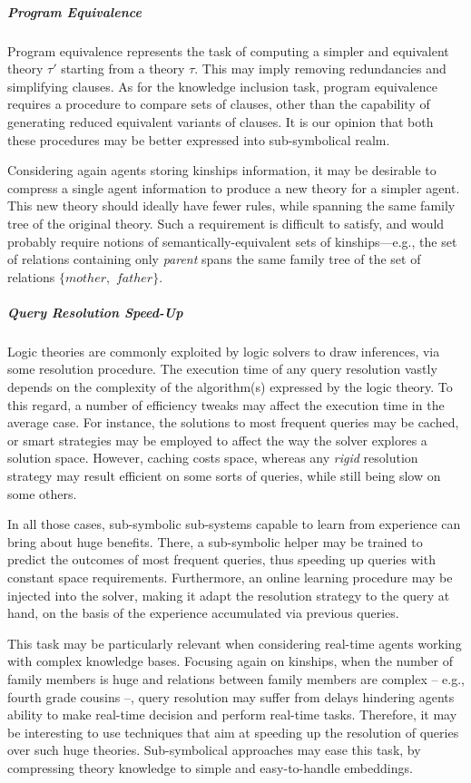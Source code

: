 \documentclass[12pt,a4paper,openright,twoside]{book}
\begin{document}
\subparagraph{Program Equivalence}

Program equivalence represents the task of computing a simpler and equivalent theory $\tau'$ starting from a theory $\tau$.
%
This may imply removing redundancies and simplifying clauses.
%
As for the knowledge inclusion task, program equivalence requires a procedure to compare sets of clauses, other than the capability of generating reduced equivalent variants of clauses.
%
It is our opinion that both these procedures may be better expressed into sub-symbolical realm.

Considering again agents storing kinships information, it may be desirable to compress a single agent information to produce a new theory for a simpler agent.
%
This new theory should ideally have fewer rules, while spanning the same family tree of the original theory.
%
Such a requirement is difficult to satisfy, and would probably require notions of semantically-equivalent sets of kinships---e.g., the set of relations containing only \textit{parent} spans the same family tree of the set of relations $\{mother,$ $father\}$.

\subparagraph{Query Resolution Speed-Up}

Logic theories are commonly exploited by logic solvers to draw inferences, via some resolution procedure.
%
The execution time of any query resolution vastly depends on the complexity of the algorithm(s) expressed by the logic theory.
%
To this regard, a number of efficiency tweaks may affect the execution time in the average case.
%
For instance, the solutions to most frequent queries may be cached, or smart strategies may be employed to affect the way the solver explores a solution space.
%
However, caching costs space, whereas any \emph{rigid} resolution strategy may result efficient on some sorts of queries, while still being slow on some others.

In all those cases, sub-symbolic sub-systems capable to learn from experience can bring about huge benefits.
%
There, a sub-symbolic helper may be trained to predict the outcomes of most frequent queries, thus speeding up queries with constant space requirements.
%
Furthermore, an online learning procedure may be injected into the solver, making it adapt the resolution strategy to the query at hand, on the basis of the experience accumulated via previous queries.

This task may be particularly relevant when considering real-time agents working with complex knowledge bases.
%
Focusing again on kinships, when the number of family members is huge and relations between family members are complex -- e.g., fourth grade cousins --, query resolution may suffer from delays hindering agents ability to make real-time decision and perform real-time tasks.
%
Therefore, it may be interesting to use techniques that aim at speeding up the resolution of queries over such huge theories.
%
Sub-symbolical approaches may ease this task, by compressing theory knowledge to simple and easy-to-handle embeddings.
\end{document}
